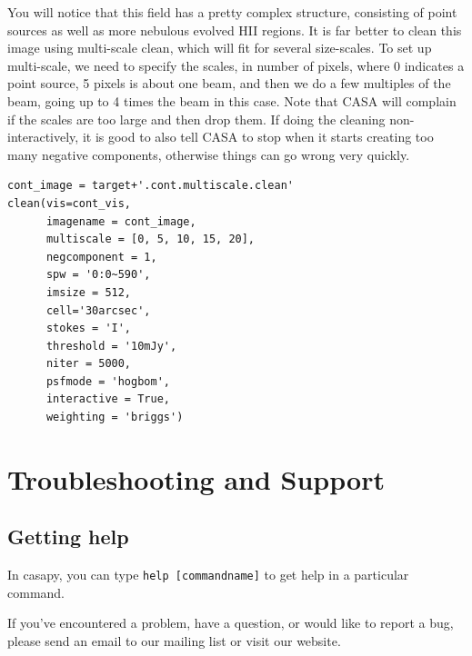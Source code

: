 \documentclass[force,almostfull,justified]{tufte-book}
\begin{document}
You will notice that this field has a pretty complex structure,
consisting of point sources as well as more nebulous evolved HII
regions. It is far better to clean this image using multi-scale clean,
which will fit for several size-scales. To set up multi-scale, we need
to specify the scales, in number of pixels, where 0 indicates a point
source, 5 pixels is about one beam, and then we do a few multiples of
the beam, going up to 4 times the beam in this case.   Note that CASA
will complain if the scales are too large and then drop them.   If doing
the cleaning non-interactively, it is good to also tell CASA to stop
when it starts creating too many negative components, otherwise things
can go wrong very quickly.


\begin{casacmd}
\begin{verbatim}
cont_image = target+'.cont.multiscale.clean'
clean(vis=cont_vis,
      imagename = cont_image,
      multiscale = [0, 5, 10, 15, 20],
      negcomponent = 1,
      spw = '0:0~590',
      imsize = 512,
      cell='30arcsec',
      stokes = 'I',
      threshold = '10mJy',
      niter = 5000,
      psfmode = 'hogbom',
      interactive = True,
      weighting = 'briggs')
\end{verbatim}
\end{casacmd}


\chapter{Troubleshooting and Support}
\label{ch:troubleshooting}

\section{Getting help}
\label{sec:getting-help}

In casapy, you can type {\tt help [commandname]} to get help in a
particular command.

If you've encountered a problem, have a question, or would like to
report a bug, please send an email to our mailing list or visit our
website.

\backmatter

\newcommand{\aaps}{Astron. Astrophys. Suppl. Ser.}




\printindex
\end{document}
